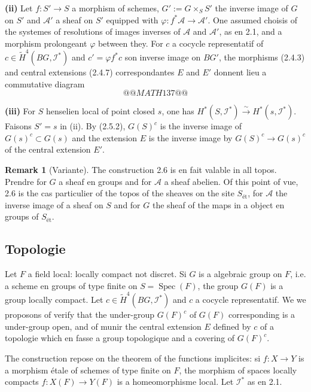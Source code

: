 \documentclass[11pt,a4paper]{article}
\theoremstyle{plain}
\theoremstyle{definition}
\newtheorem{remark}[theorem]{Remark}
\DeclareMathOperator{\Spec}{Spec}
\newcommand{\et}{\text{\'et}}
\begin{document}
\textbf{(ii)} Let $f : S' \to S$ a morphism of schemes, $G' := G \times_S S'$ the inverse image of $G$ on $S'$ and $\mathscr{A}'$ a sheaf on $S'$ equipped with $\varphi : f^* \mathscr{A} \to \mathscr{A}'$. One assumed choisis of the systemes of resolutions of images inverses of $\mathscr{A}$ and $\mathscr{A}'$, as en 2.1, and a morphism prolongeant $\varphi$ between they. For $c$ a cocycle representatif of $c \in \widetilde{H}^4(BG, \mathscr{I}^*)$ and $c' = \varphi f^* c$ son inverse image on $BG'$, the morphisms (2.4.3) and central extensions (2.4.7) correspondantes $E$ and $E'$ donnent lieu a commutative diagram
\[
@@MATH137@@
\]

\textbf{(iii)} For $S$ henselien local of point closed $s$, one has $H^*(S, \mathscr{I}^*) \xrightarrow{\sim} H^*(s, \mathscr{I}^*)$. Faisons $S' = s$ in (ii). By (2.5.2), $G(S)^c$ is the inverse image of $G(s)^c \subset G(s)$ and the extension $E$ is the inverse image by $G(S)^c \to G(s)^c$ of the central extension $E'$.

\begin{remark}[Variante]\label{2.8}
The construction 2.6 is en fait valable in all topos. Prendre for $G$ a sheaf en groups and for $\mathscr{A}$ a sheaf abelien. Of this point of vue, 2.6 is the cas particulier of the topos of the sheaves on the site $S_{\et}$, for $\mathscr{A}$ the inverse image of a sheaf on $S$ and for $G$ the sheaf of the maps in a object en groups of $S_{\et}$.
\end{remark}

\subsection{Topologie}\label{2.9}

Let $F$ a field local: locally compact not discret. Si $G$ is a algebraic group on $F$, i.e. a scheme en groups of type finite on $S = \Spec(F)$, the group $G(F)$ is a group locally compact. Let $c \in \widetilde{H}^4(BG, \mathscr{I}^*)$ and $c$ a cocycle representatif. We we proposons of verify that the under-group $G(F)^c$ of $G(F)$ corresponding is a under-group open, and of munir the central extension $E$ defined by $c$ of a topologie which en fasse a group topologique and a covering of $G(F)^c$.

The construction repose on the theorem of the functions implicites: si $f : X \to Y$ is a morphism étale of schemes of type finite on $F$, the morphism of spaces locally compacts $f : X(F) \to Y(F)$ is a homeomorphisme local. Let $\mathscr{I}^*$ as en 2.1.
\end{document}
